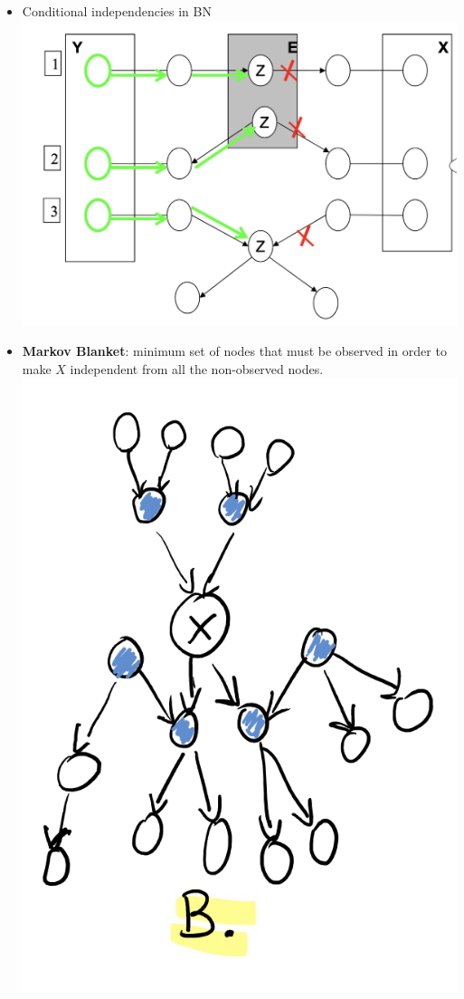 \documentclass{article}
\begin{document}
\begin{itemize}
    \item Conditional independencies in BN \\
    \includegraphics[scale=0.5]{cond_independencies_in_bn.png}
    \item \textbf{Markov Blanket}: minimum set of nodes that must be observed in order to make $X$ independent from all the non-observed nodes.\\
    \includegraphics[scale=0.5]{markov_blanket}

\end{itemize}
\end{document}
